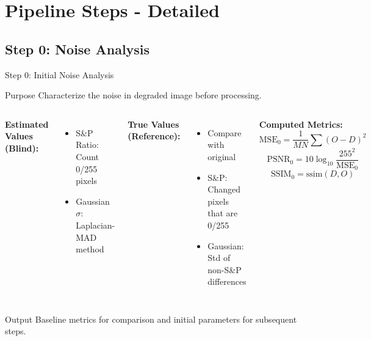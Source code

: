\documentclass[aspectratio=169]{beamer}
\begin{document}
\section{Pipeline Steps - Detailed}

\subsection{Step 0: Noise Analysis}

\begin{frame}{Step 0: Initial Noise Analysis}
    \begin{block}{Purpose}
        Characterize the noise in degraded image before processing.
    \end{block}
    
    \begin{columns}
        \textbf{Estimated Values (Blind):}
        \begin{itemize}
            \item S\&P Ratio: Count 0/255 pixels
            \item Gaussian $\sigma$: Laplacian-MAD method
        \end{itemize}
        
        \textbf{True Values (Reference):}
        \begin{itemize}
            \item Compare with original
            \item S\&P: Changed pixels that are 0/255
            \item Gaussian: Std of non-S\&P differences
        \end{itemize}
        
        \textbf{Computed Metrics:}
        \begin{equation}
            \text{MSE}_0 = \frac{1}{MN}\sum(O - D)^2
        \end{equation}
        \begin{equation}
            \text{PSNR}_0 = 10\log_{10}\frac{255^2}{\text{MSE}_0}
        \end{equation}
        \begin{equation}
            \text{SSIM}_0 = \text{ssim}(D, O)
        \end{equation}
    \end{columns}
    
    \vspace{0.3cm}
    \begin{alertblock}{Output}
        Baseline metrics for comparison and initial parameters for subsequent steps.
    \end{alertblock}
\end{frame}
\end{document}
